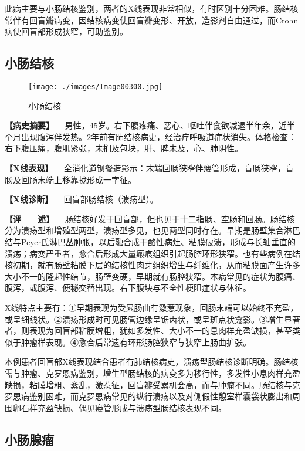 此病主要与小肠结核鉴别，两者的X线表现非常相似，有时区别十分困难。肠结核常伴有回盲瓣病变，因结核病变使回盲瓣变形、开放，造影剂自由通过，而Crohn病使回盲部形成狭窄，可助鉴别。

\subsection{小肠结核}

\begin{figure}[!htbp]
 \centering
 \texttt{[image: ./images/Image00300.jpg]}
 \captionsetup{justification=centering}
 \caption{小肠结核}
 \label{fig5-5-4}
  \end{figure} 

\textbf{【病史摘要】}
　男性，45岁。右下腹疼痛、恶心、呕吐伴食欲减退半年余，近半个月出现腹泻伴发热。2年前有肺结核病史，经治疗呼吸道症状消失。体格检查：右下腹压痛，腹肌紧张，未扪及包块，肝、脾未及，心、肺阴性。

\textbf{【X线表现】}
　全消化道钡餐造影示：末端回肠狭窄伴瘘管形成，盲肠狭窄，盲肠及回肠末端上移靠拢形成一字征。

\textbf{【X线诊断】} 　回盲部肠结核（溃疡型）。

\textbf{【评　　述】}
　肠结核好发于回盲部，但也见于十二指肠、空肠和回肠。肠结核分为溃疡型和增殖型两型，溃疡型多见，也见两型同时存在。早期是肠壁集合淋巴结与Peyer氏淋巴丛肿胀，以后融合成干酪性病灶、粘膜破溃，形成与长轴垂直的溃疡；病变严重者，愈合后形成大量瘢痕组织引起肠腔环形狭窄。也有些病例在结核初期，就有肠壁粘膜下层的结核性肉芽组织增生与纤维化，从而粘膜面产生许多大小不一的隆起性结节，肠壁变硬，早期就有肠腔狭窄。本病常见的症状为腹痛、腹泻，或腹泻、便秘交替出现。右下腹块与不全性梗阻症状与体征。

X线特点主要有：①早期表现为受累肠曲有激惹现象，回肠末端可以始终不充盈，或呈细线状。②溃疡形成时可见肠管边缘呈锯齿状，或呈斑点状龛影。③增生显著者，则表现为回盲部粘膜增粗，犹如多发性、大小不一的息肉样充盈缺损，甚至类似于肿瘤样表现。④愈合后常遗有环形肠腔狭窄与狭窄上肠曲扩张。

本例患者回盲部X线表现结合患者有肺结核病史，溃疡型肠结核诊断明确。肠结核需与肿瘤、克罗恩病鉴别，增生型肠结核的病变多为移行性，多发性小息肉样充盈缺损，粘膜增粗、紊乱，激惹征，回盲瓣受累机会高，而与肿瘤不同。肠结核与克罗恩病鉴别困难，而克罗恩病常见的纵行溃疡以及对侧假性憩室样囊袋状膨出和周围卵石样充盈缺损、偶见瘘管形成与溃疡型肠结核表现不同。

\subsection{小肠腺瘤}

